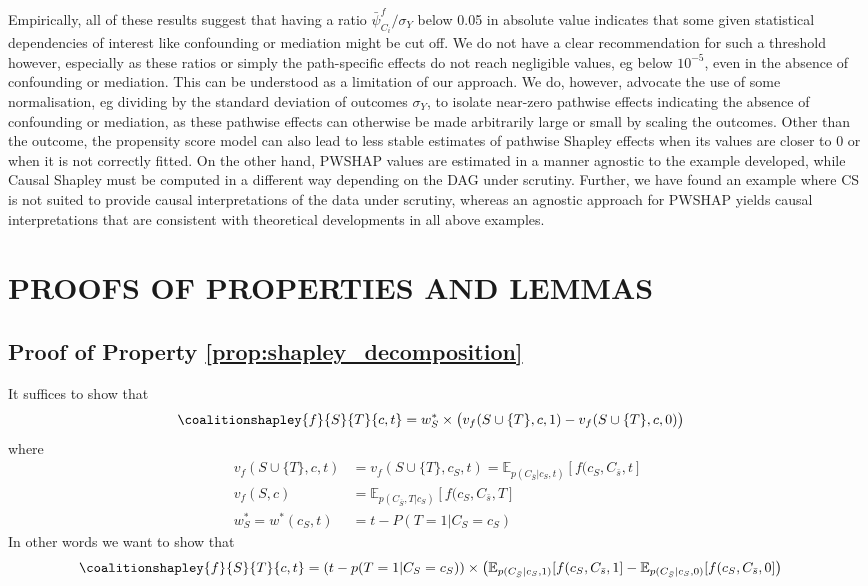  Empirically, all of these results suggest that having a ratio $\bar{\psi}^f_{C_i} / \sigma_Y$ below 0.05 in absolute value indicates that some given statistical dependencies of interest like confounding or mediation might be cut off. We do not have a clear recommendation for such a threshold however, especially as these ratios or simply the path-specific effects do not reach negligible values, eg below $10^{-5}$, even in the absence of confounding or mediation. This can be understood as a limitation of our approach. We do, however, advocate the use of some normalisation, eg dividing by the standard deviation of outcomes $\sigma_Y$, to isolate near-zero pathwise effects indicating the absence of confounding or mediation, as these pathwise effects can otherwise be made arbitrarily large or small by scaling the outcomes. Other than the outcome, the propensity score model can also lead to less stable estimates of pathwise Shapley effects when its values are closer to 0 or when it is not correctly fitted. On the other hand, PWSHAP values are estimated in a manner agnostic to the example developed, while Causal Shapley must be computed in a different way depending on the DAG under scrutiny. Further, we have found an example where CS is not suited to provide causal interpretations of the data under scrutiny, whereas an agnostic approach for PWSHAP yields causal interpretations that are consistent with theoretical developments in all above examples. 
\fi
\vspace*{-0.2cm}





\section{PROOFS OF PROPERTIES AND LEMMAS} \label{sec:proofs}


\subsection{Proof of Property \ref{prop:shapley_decomposition}}
\label{proof:shapley_decomposition}
It suffices to show that
\begin{align*}
    \coalitionshapley{f}{S}{T}{c,t} &= w^*_{S} \times \big(v_f(S \cup \{T\},c,1) - v_f(S \cup \{T\},c,0) \big)
\end{align*}
where 
\begin{align*}
     v_{f}(S \cup \{T\},c,t) &= v_{f}(S \cup \{T\},c_S,t) = \mathbb{E}_{p(C_{\bar{S}} | c_S, t)} [f(c_S, C_{\bar{s}}, t] \\
     v_{f}(S, c) &= \mathbb{E}_{p(C_{\bar{S}}, T | c_S)} [f(c_S, C_{\bar{s}}, T] \\
     w^*_{S} = w^*(c_S, t) &= t -  P(T=1| C_S=c_S)
\end{align*}
In other words we want to show that
\begin{align*}
    \coalitionshapley{f}{S}{T}{c,t} &= (t - p(T=1 | C_S=c_S)) \times \big(\mathbb{E}_{p(C_{\bar{S}} | c_S, 1)} [f(c_S, C_{\bar{s}}, 1]  - \mathbb{E}_{p(C_{\bar{S}} | c_S, 0)} [f(c_S, C_{\bar{s}}, 0]  \big)
\end{align*}


